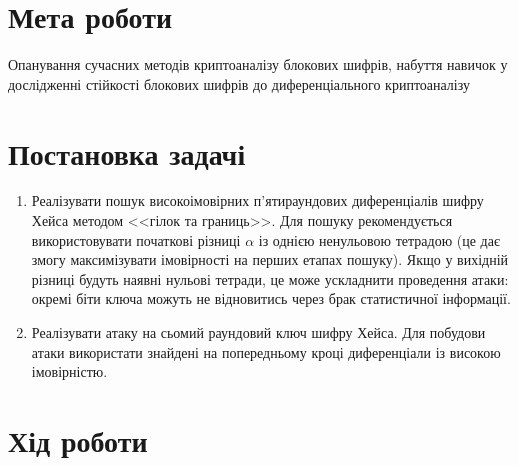 \documentclass[12pt,a4paper]{article}
\begin{document}
\section{Мета роботи}

Опанування сучасних методів криптоаналізу блокових шифрів, набуття навичок у дослідженні стійкості блокових шифрів до диференціального криптоаналізу

\section{Постановка задачі}

\begin{enumerate}
\item 
Реалізувати пошук високоімовірних п'ятираундових диференціалів шифру Хейса методом <<гілок та границь>>. Для пошуку рекомендується використовувати початкові різниці $\alpha$ із однією ненульовою тетрадою (це дає змогу максимізувати імовірності на перших етапах пошуку). Якщо у вихідній різниці будуть наявні нульові тетради, це може ускладнити проведення атаки: окремі біти ключа можуть не відновитись через брак статистичної інформації.
\item
Реалізувати атаку на сьомий раундовий ключ шифру Хейса. Для побудови атаки використати знайдені на попередньому кроці диференціали із високою імовірністю.
\end{enumerate}


\section{Хід роботи}
\end{document}
